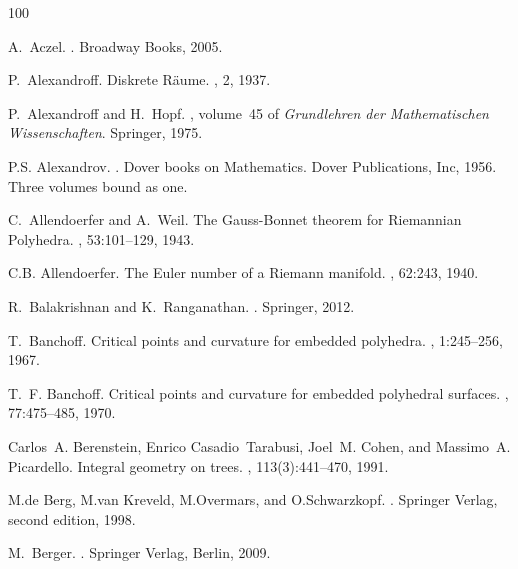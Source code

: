 \documentclass[12pt]{amsart}
\begin{document}

\begin{thebibliography}{100}

A.~Aczel.
.
\newblock Broadway Books, 2005.

P.~Alexandroff.
\newblock Diskrete {R\"aume}.
, 2, 1937.

P.~Alexandroff and H.~Hopf.
, volume~45 of {\em Grundlehren der Mathematischen
  Wissenschaften}.
\newblock Springer, 1975.

P.S. Alexandrov.
.
\newblock Dover books on Mathematics. Dover Publications, Inc, 1956.
\newblock Three volumes bound as one.

C.~Allendoerfer and A.~Weil.
\newblock The {G}auss-{B}onnet theorem for {R}iemannian {P}olyhedra.
, 53:101--129,
  1943.

C.B. Allendoerfer.
\newblock The {E}uler number of a {R}iemann manifold.
, 62:243, 1940.

R.~Balakrishnan and K.~Ranganathan.
.
\newblock Springer, 2012.

T.~Banchoff.
\newblock Critical points and curvature for embedded polyhedra.
, 1:245--256, 1967.

T.~F. Banchoff.
\newblock Critical points and curvature for embedded polyhedral surfaces.
, 77:475--485, 1970.

Carlos~A. Berenstein, Enrico Casadio~Tarabusi, Joel~M. Cohen, and Massimo~A.
  Picardello.
\newblock Integral geometry on trees.
, 113(3):441--470, 1991.

M.de Berg, M.van Kreveld, M.Overmars, and O.Schwarzkopf.
.
\newblock Springer Verlag, second edition, 1998.

M.~Berger.
.
\newblock Springer Verlag, Berlin, 2009.


\end{thebibliography}
\end{document}
